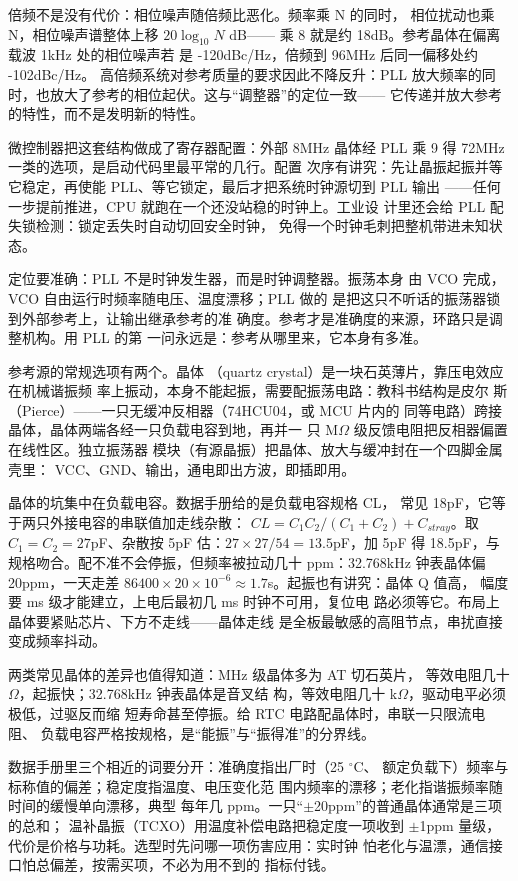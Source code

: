 倍频不是没有代价：相位噪声随倍频比恶化。频率乘 N 的同时，
相位扰动也乘 N，相位噪声谱整体上移 $20\log_{10}N$ dB——
乘 8 就是约 18dB。参考晶体在偏离载波 1kHz 处的相位噪声若
是 -120dBc/Hz，倍频到 96MHz 后同一偏移处约 -102dBc/Hz。
高倍频系统对参考质量的要求因此不降反升：PLL 放大频率的同
时，也放大了参考的相位起伏。这与“调整器”的定位一致——
它传递并放大参考的特性，而不是发明新的特性。

微控制器把这套结构做成了寄存器配置：外部 8MHz 晶体经 PLL
乘 9 得 72MHz 一类的选项，是启动代码里最平常的几行。配置
次序有讲究：先让晶振起振并等它稳定，再使能 PLL、等它锁定，最后才把系统时钟源切到 PLL 输出
——任何一步提前推进，CPU 就跑在一个还没站稳的时钟上。工业设
计里还会给 PLL 配失锁检测：锁定丢失时自动切回安全时钟，
免得一个时钟毛刺把整机带进未知状态。

定位要准确：PLL 不是时钟发生器，而是时钟调整器。振荡本身
由 VCO 完成，VCO 自由运行时频率随电压、温度漂移；PLL 做的
是把这只不听话的振荡器锁到外部参考上，让输出继承参考的准
确度。参考才是准确度的来源，环路只是调整机构。用 PLL 的第
一问永远是：参考从哪里来，它本身有多准。

参考源的常规选项有两个。晶体
（quartz crystal）是一块石英薄片，靠压电效应在机械谐振频
率上振动，本身不能起振，需要配振荡电路：教科书结构是皮尔
斯（Pierce）——一只无缓冲反相器（74HCU04，或 MCU 片内的
同等电路）跨接晶体，晶体两端各经一只负载电容到地，再并一
只 M$\Omega$ 级反馈电阻把反相器偏置在线性区。独立振荡器
模块（有源晶振）把晶体、放大与缓冲封在一个四脚金属壳里：
VCC、GND、输出，通电即出方波，即插即用。

晶体的坑集中在负载电容。数据手册给的是负载电容规格 CL，
常见 18pF，它等于两只外接电容的串联值加走线杂散：
$CL = C_1 C_2 / (C_1 + C_2) + C_{stray}$。取 $C_1 = C_2 =
27$pF、杂散按 5pF 估：$27 \times 27 / 54 = 13.5$pF，加 5pF
得 18.5pF，与规格吻合。配不准不会停振，但频率被拉动几十
ppm：32.768kHz 钟表晶体偏 20ppm，一天走差 $86400 \times
20 \times 10^{-6} \approx 1.7$s。起振也有讲究：晶体 Q 值高，
幅度要 ms 级才能建立，上电后最初几 ms 时钟不可用，复位电
路必须等它。布局上晶体要紧贴芯片、下方不走线——晶体走线
是全板最敏感的高阻节点，串扰直接变成频率抖动。

两类常见晶体的差异也值得知道：MHz 级晶体多为 AT 切石英片，
等效电阻几十 $\Omega$，起振快；32.768kHz 钟表晶体是音叉结
构，等效电阻几十 k$\Omega$，驱动电平必须极低，过驱反而缩
短寿命甚至停振。给 RTC 电路配晶体时，串联一只限流电阻、
负载电容严格按规格，是“能振”与“振得准”的分界线。

数据手册里三个相近的词要分开：准确度指出厂时（25 $^{\circ}$C、
额定负载下）频率与标称值的偏差；稳定度指温度、电压变化范
围内频率的漂移；老化指谐振频率随时间的缓慢单向漂移，典型
每年几 ppm。一只“$\pm$20ppm”的普通晶体通常是三项的总和；
温补晶振（TCXO）用温度补偿电路把稳定度一项收到 $\pm$1ppm
量级，代价是价格与功耗。选型时先问哪一项伤害应用：实时钟
怕老化与温漂，通信接口怕总偏差，按需买项，不必为用不到的
指标付钱。


